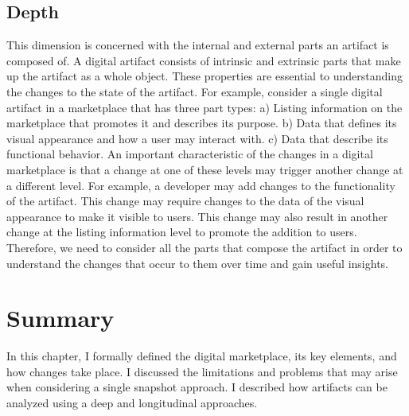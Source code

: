 \subsection{Depth}
This dimension is concerned with the internal and external parts an artifact is composed of.
A digital artifact consists of intrinsic and extrinsic parts that make up the artifact as a whole object.
These properties are essential to understanding the changes to the state of the artifact.
For example, consider a single digital artifact in a marketplace that has three part types:
a) Listing information on the marketplace that promotes it and describes its purpose.
b) Data that defines its visual appearance and how a user may interact with.
c) Data that describe its functional behavior.
An important characteristic of the changes in a digital marketplace is that a change at one of these levels may trigger another change at a different level.
For example, a developer may add changes to the functionality of the artifact.
This change may require changes to the data of the visual appearance to make it visible to users.
This change may also result in another change at the listing information level to promote the addition to users.
Therefore, we need to consider all the parts that compose the artifact in order to understand the changes that occur to them over time and gain useful insights.

\section{Summary}
In this chapter, I formally defined the digital marketplace, its key elements, and how changes take place.
I discussed the limitations and problems that may arise when considering a single snapshot approach.
I described how artifacts can be analyzed using a deep and longitudinal approaches.